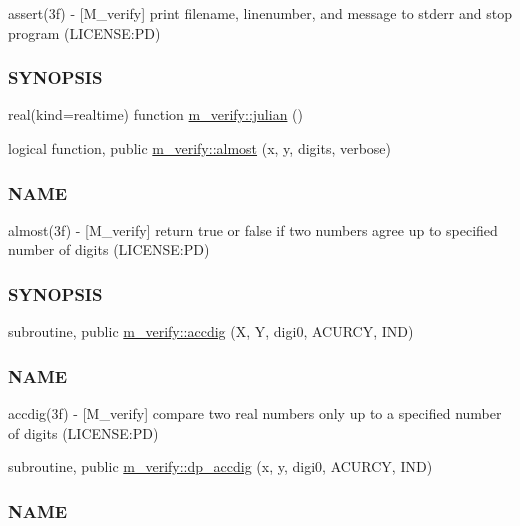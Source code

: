 \begin{DoxyCompactItemize}
\begin{DoxyCompactList}
assert(3f) -\/ \mbox{[}M\+\_\+verify\mbox{]} print filename, linenumber, and message to stderr and stop program (L\+I\+C\+E\+N\+SE\+:PD) \subsubsection*{S\+Y\+N\+O\+P\+S\+IS}\end{DoxyCompactList}\item 
real(kind=realtime) function \mbox{\hyperlink{namespacem__verify_a1a97667eb1d53ce5b97a60c4a9ebe565}{m\+\_\+verify\+::julian}} ()
\item 
logical function, public \mbox{\hyperlink{namespacem__verify_ac5b0a0323929702a4b9e3fb918ea19b3}{m\+\_\+verify\+::almost}} (x, y, digits, verbose)
\begin{DoxyCompactList}\small\item\em \subsubsection*{N\+A\+ME}

almost(3f) -\/ \mbox{[}M\+\_\+verify\mbox{]} return true or false if two numbers agree up to specified number of digits (L\+I\+C\+E\+N\+SE\+:PD) \subsubsection*{S\+Y\+N\+O\+P\+S\+IS}\end{DoxyCompactList}\item 
subroutine, public \mbox{\hyperlink{namespacem__verify_a311d01ea90882e4db1e87520ba731d5c}{m\+\_\+verify\+::accdig}} (X, Y, digi0, A\+C\+U\+R\+CY, I\+ND)
\begin{DoxyCompactList}\small\item\em \subsubsection*{N\+A\+ME}

accdig(3f) -\/ \mbox{[}M\+\_\+verify\mbox{]} compare two real numbers only up to a specified number of digits (L\+I\+C\+E\+N\+SE\+:PD) \end{DoxyCompactList}\item 
subroutine, public \mbox{\hyperlink{namespacem__verify_a7408df33e6934a8959fdeda8cc3fb5ff}{m\+\_\+verify\+::dp\+\_\+accdig}} (x, y, digi0, A\+C\+U\+R\+CY, I\+ND)
\begin{DoxyCompactList}\small\item\em \subsubsection*{N\+A\+ME}


\end{DoxyCompactList}
\end{DoxyCompactItemize}
